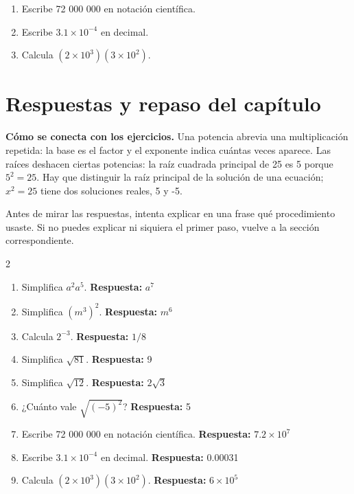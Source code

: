 \documentclass[10pt,oneside,openany]{book}
\begin{document}
\begin{practica}

\begin{enumerate}

\item Escribe 72 000 000 en notación científica.

\item Escribe $3.1\times10^{-4}$ en decimal.

\item Calcula $(2\times10^3)(3\times10^2)$.

\end{enumerate}

\end{practica}



\section{Respuestas y repaso del capítulo}

\textbf{Cómo se conecta con los ejercicios.} Una potencia abrevia una multiplicación repetida: la base es el factor y el exponente indica cuántas veces aparece. Las raíces deshacen ciertas potencias: la raíz cuadrada principal de 25 es 5 porque $5^2 = 25$. Hay que distinguir la raíz principal de la solución de una ecuación; $x^2 = 25$ tiene dos soluciones reales, 5 y -5.

Antes de mirar las respuestas, intenta explicar en una frase qué procedimiento usaste. Si no puedes explicar ni siquiera el primer paso, vuelve a la sección correspondiente.

\begin{multicols}{2}\begin{enumerate}

\item Simplifica $a^2a^5$. \textbf{Respuesta:} $a^7$

\item Simplifica $(m^3)^2$. \textbf{Respuesta:} $m^6$

\item Calcula $2^{-3}$. \textbf{Respuesta:} $1/8$

\item Simplifica $\sqrt{81}$. \textbf{Respuesta:} 9

\item Simplifica $\sqrt{12}$. \textbf{Respuesta:} $2\sqrt3$

\item ¿Cuánto vale $\sqrt{(-5)^2}$? \textbf{Respuesta:} 5

\item Escribe 72 000 000 en notación científica. \textbf{Respuesta:} $7.2\times10^7$

\item Escribe $3.1\times10^{-4}$ en decimal. \textbf{Respuesta:} 0.00031

\item Calcula $(2\times10^3)(3\times10^2)$. \textbf{Respuesta:} $6\times10^5$

\end{enumerate}\end{multicols}
\end{document}

